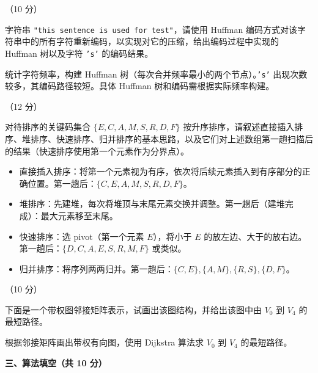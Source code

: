 \begin{question}[Huffman编码]（10 分）

字符串 \texttt{"this sentence is used for test"}，请使用 Huffman 编码方式对该字符串中的所有字符重新编码，以实现对它的压缩，给出编码过程中实现的 Huffman 树以及字符 \texttt{'s'} 的编码结果。

\begin{solution}
统计字符频率，构建 Huffman 树（每次合并频率最小的两个节点）。\texttt{'s'} 出现次数较多，其编码路径较短。具体 Huffman 树和编码需根据实际频率构建。
\end{solution}
\end{question}

\begin{question}[排序算法]（12 分）

对待排序的关键码集合 $\{E,C,A,M,S,R,D,F\}$ 按升序排序，请叙述直接插入排序、堆排序、快速排序、归并排序的基本思路，以及它们对上述数组第一趟扫描后的结果（快速排序使用第一个元素作为分界点）。

\begin{solution}
\begin{itemize}
  \item 直接插入排序：将第一个元素视为有序，依次将后续元素插入到有序部分的正确位置。第一趟后：$\{C,E,A,M,S,R,D,F\}$。
  \item 堆排序：先建堆，每次将堆顶与末尾元素交换并调整。第一趟后（建堆完成）：最大元素移至末尾。
  \item 快速排序：选 pivot（第一个元素 $E$），将小于 $E$ 的放左边、大于的放右边。第一趟后：$\{D,C,A,E,S,R,M,F\}$ 或类似。
  \item 归并排序：将序列两两归并。第一趟后：$\{C,E\},\{A,M\},\{R,S\},\{D,F\}$。
\end{itemize}
\end{solution}
\end{question}

\begin{question}[最短路径]（10 分）

下面是一个带权图邻接矩阵表示，试画出该图结构，并给出该图中由 $V_0$ 到 $V_4$ 的最短路径。

\begin{solution}
根据邻接矩阵画出带权有向图，使用 Dijkstra 算法求 $V_0$ 到 $V_4$ 的最短路径。
\end{solution}
\end{question}

\clearpage

\textbf{三、算法填空（共 10 分）}

